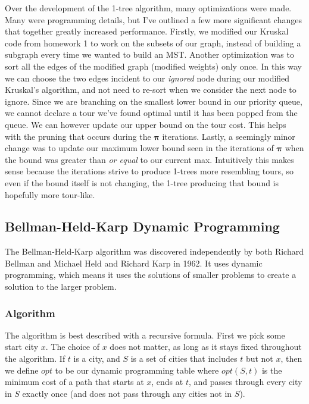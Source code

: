 \documentclass[11pt]{article}
\newcommand{\ve}[1]{\boldsymbol{#1}}
\begin{document}
Over the development of the 1-tree algorithm, many optimizations were made. Many were programming details, but I've outlined a few more significant changes that together greatly increased performance. Firstly, we modified our Kruskal code from homework 1 to work on the subsets of our graph, instead of building a subgraph every time we wanted to build an MST. Another optimization was to sort all the edges of the modified graph (modified weights) only once. In this way we can choose the two edges incident to our \emph{ignored} node during our modified Kruskal's algorithm, and not need to re-sort when we consider the next node to ignore. Since we are branching on the smallest lower bound in our priority queue, we cannot declare a tour we've found optimal until it has been popped from the queue. We can however update our upper bound on the tour cost. This helps with the pruning that occurs during the $\ve{\pi}$ iterations. Lastly, a seemingly minor change was to update our maximum lower bound seen in the iterations of $\ve{\pi}$ when the bound was greater than \emph{or equal} to our current max. Intuitively this makes sense because the iterations strive to produce 1-trees more resembling tours, so even if the bound itself is not changing, the 1-tree producing that bound is hopefully more tour-like.

\subsection{Bellman-Held-Karp Dynamic Programming}

The Bellman-Held-Karp algorithm was discovered independently by both Richard Bellman \cite{Bellman} and Michael Held and Richard Karp \cite{HeldKarp} in 1962. It uses dynamic programming, which means it uses the solutions of smaller problems to create a solution to the larger problem.

\subsubsection{Algorithm}

The algorithm is best described with a recursive formula. First we pick some start city $x$. The choice of $x$ does not matter, as long as it stays fixed throughout the algorithm. If $t$ is a city, and $S$ is a set of cities that includes $t$ but not $x$, then we define $opt$ to be our dynamic programming table where $opt(S,t)$ is the minimum cost of a path that starts at $x$, ends at $t$, and passes through every city in $S$ exactly once (and does not pass through any cities not in $S$).
\end{document}

